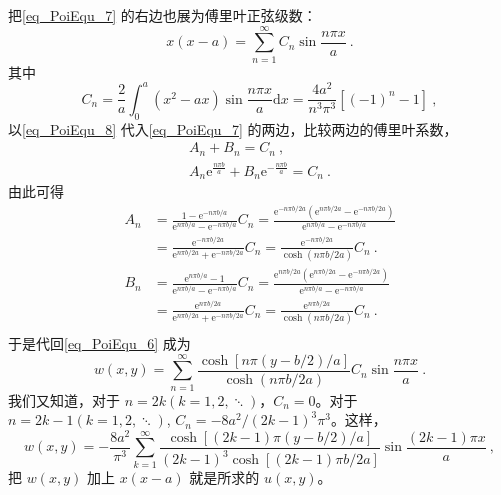 \begin{example}{}
\begin{equation}
    \end{equation}
    把\autoref{eq_PoiEqu_7} 的右边也展为傅里叶正弦级数：
    \begin{equation} \label{eq_PoiEqu_8}
        x(x-a)=\sum_{n=1}^{\infty} C_{n} \sin \frac{n \pi x}{a}~.
    \end{equation}
    其中
    \begin{equation}
        C_{n}=\frac{2}{a} \int_{0}^{a}\left(x^{2}-a x\right) \sin \frac{n \pi x}{a} \mathrm{d} x=\frac{4 a^{2}}{n^{3} \pi^{3}}\left[(-1)^{n}-1\right]~,
    \end{equation}
    以\autoref{eq_PoiEqu_8} 代入\autoref{eq_PoiEqu_7} 的两边，比较两边的傅里叶系数，
    \begin{equation}
        \begin{array}{c}A_{n}+B_{n}=C_{n}~,\\ A_{n} \mathrm{e}^{\frac{n \pi b}{a}}+B_{n} \mathrm{e}^{-\frac{n \pi b}{a}}=C_{n}~.\end{array}
    \end{equation}
    由此可得
    \begin{equation}
        \begin{aligned}
            A_n&=\frac{1-\text{e}^{-n\pi b/a}}{\text{e}^{n\pi b/a}-\text{e}^{-n\pi b/a}}C_n=\frac{\text{e}^{-n\pi b/2a}\left( \text{e}^{n\pi b/2a}-\text{e}^{-n\pi b/2a} \right)}{\text{e}^{n\pi b/a}-\text{e}^{-n\pi b/a}}\\
            &=\frac{\text{e}^{-n\pi b/2a}}{\text{e}^{n\pi b/2a}+\text{e}^{-n\pi b/2a}}C_n=\frac{\text{e}^{-n\pi b/2a}}{\cosh \left( n\pi b/2a \right)}C_n~.\\
            B_n&=\frac{\text{e}^{n\pi b/a}-1}{\text{e}^{n\pi b/a}-\text{e}^{-n\pi b/a}}C_n=\frac{\text{e}^{n\pi b/2a}\left( \text{e}^{n\pi b/2a}-\text{e}^{-n\pi b/2a} \right)}{\text{e}^{n\pi b/a}-\text{e}^{-n\pi b/a}}\\
            &=\frac{\text{e}^{n\pi b/2a}}{\text{e}^{n\pi b/2a}+\text{e}^{-n\pi b/2a}}C_n=\frac{\text{e}^{n\pi b/2a}}{\cosh \left( n\pi b/2a \right)}C_n~.\\
        \end{aligned}
    \end{equation}
    于是代回\autoref{eq_PoiEqu_6} 成为
    \begin{equation}
        w(x, y)=\sum_{n=1}^{\infty} \frac{\cosh [n \pi(y-b / 2) / a]}{\cosh (n \pi b / 2 a)} C_{n} \sin \frac{n \pi x}{a}~.
    \end{equation}
    我们又知道，对于 $n=2k(k=1,2,\ddots)$，$C_n=0$。对于 $n=2k-1(k=1,2,\ddots)$, $C_n=-8a^2/(2k-1)^3\pi^3$。这样，
    \begin{equation}
        w(x, y)=-\frac{8 a^{2}}{\pi^{3}} \sum_{k=1}^{\infty} \frac{\cosh [(2 k-1) \pi(y-b / 2) / a]}{(2 k-1)^{3} \cosh [(2 k-1) \pi b / 2 a]} \sin \frac{(2 k-1) \pi x}{a}~,
    \end{equation}
    把 $w(x,y)$ 加上 $x(x-a)$ 就是所求的 $u(x,y)$。
\end{example}
